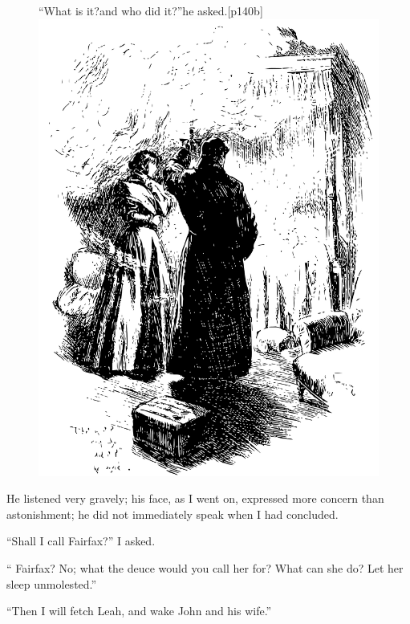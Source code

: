 \begin{figure}
	\begin{sidecaption}{\enquote{What is it?\linebreak and who did it?}\linebreak he asked.}[p140b]
		\centering
		\includegraphics[width=\linewidth]{images/p140b.pdf}
	\end{sidecaption}
\end{figure}

He listened very gravely; his face, as I went on, expressed more concern
than astonishment; he did not immediately speak when I had concluded.

\enquote{Shall I call \Mrs{} Fairfax?} I asked.

\enquote{\Mrs{} Fairfax? No; what the deuce would you call her for? What
can she do? Let her sleep unmolested.}

\enquote{Then I will fetch Leah, and wake John and his wife.}

